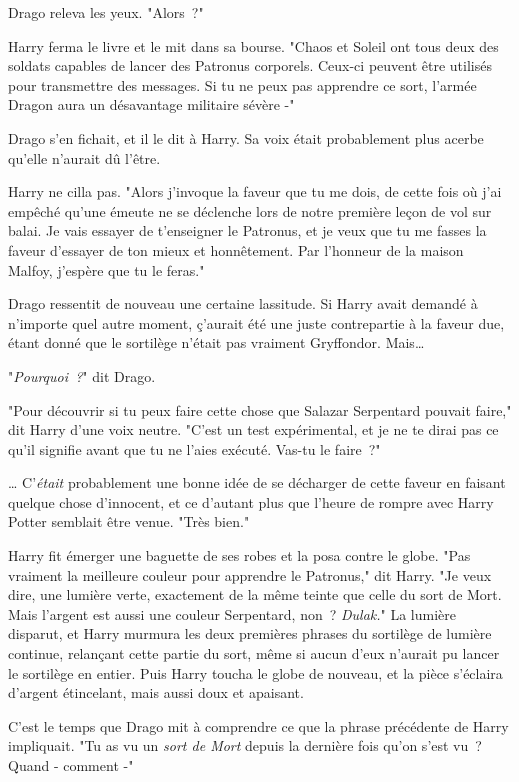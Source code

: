 Drago releva les yeux. "Alors~?"

Harry ferma le livre et le mit dans sa bourse. "Chaos et Soleil ont tous deux des soldats capables de lancer des Patronus corporels. Ceux-ci peuvent être utilisés pour transmettre des messages. Si tu ne peux pas apprendre ce sort, l'armée Dragon aura un désavantage militaire sévère -"

Drago s'en fichait, et il le dit à Harry. Sa voix était probablement plus acerbe qu'elle n'aurait dû l'être.

Harry ne cilla pas. "Alors j'invoque la faveur que tu me dois, de cette fois où j'ai empêché qu'une émeute ne se déclenche lors de notre première leçon de vol sur balai. Je vais essayer de t'enseigner le Patronus, et je veux que tu me fasses la faveur d'essayer de ton mieux et honnêtement. Par l'honneur de la maison Malfoy, j'espère que tu le feras."

Drago ressentit de nouveau une certaine lassitude. Si Harry avait demandé à n'importe quel autre moment, ç'aurait été une juste contrepartie à la faveur due, étant donné que le sortilège n'était pas vraiment Gryffondor. Mais…

"\emph{Pourquoi~?}" dit Drago.

"Pour découvrir si tu peux faire cette chose que Salazar Serpentard pouvait faire," dit Harry d'une voix neutre. "C'est un test expérimental, et je ne te dirai pas ce qu'il signifie avant que tu ne l'aies exécuté. Vas-tu le faire~?"

… C'\emph{était} probablement une bonne idée de se décharger de cette faveur en faisant quelque chose d'innocent, et ce d'autant plus que l'heure de rompre avec Harry Potter semblait être venue. "Très bien."

Harry fit émerger une baguette de ses robes et la posa contre le globe. "Pas vraiment la meilleure couleur pour apprendre le Patronus," dit Harry. "Je veux dire, une lumière verte, exactement de la même teinte que celle du sort de Mort. Mais l'argent est aussi une couleur Serpentard, non~? \emph{Dulak.}" La lumière disparut, et Harry murmura les deux premières phrases du sortilège de lumière continue, relançant cette partie du sort, même si aucun d'eux n'aurait pu lancer le sortilège en entier. Puis Harry toucha le globe de nouveau, et la pièce s'éclaira d'argent étincelant, mais aussi doux et apaisant.

C'est le temps que Drago mit à comprendre ce que la phrase précédente de Harry impliquait. "Tu as vu un \emph{sort de Mort} depuis la dernière fois qu'on s'est vu~? Quand - comment -"

